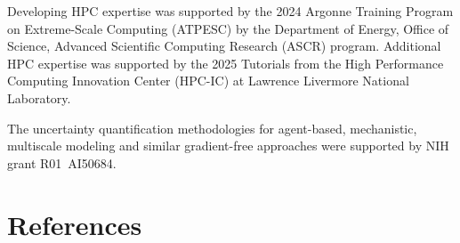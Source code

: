 \documentclass[
portrait,
custom
]{sciposter}
\begin{document}
\begin{multicols}{2}
  Developing HPC expertise was supported by the 2024 %
  Argonne Training Program on Extreme-Scale Computing (ATPESC) %
  by the Department of Energy, %
  Office of Science, %
  Advanced Scientific Computing Research (ASCR) program.
  Additional HPC expertise was supported by the 2025 Tutorials from the %
  High Performance Computing Innovation Center (HPC-IC) at %
  Lawrence Livermore National Laboratory.
  \medskip

  The uncertainty quantification methodologies %
  for agent-based, mechanistic, multiscale modeling %
  and similar gradient-free approaches%
  \supercite{%
    nanda_2023,%
    aguiar_2024%
  } %
  were supported by NIH grant R01~AI50684.

  \section*{References}
  {
    \setlength{\columnsep}{1.5pc}
    \begin{multicols}{2}
      \printbibliography[heading=none]{}
    \end{multicols}
  }

\end{multicols}
\end{document}
